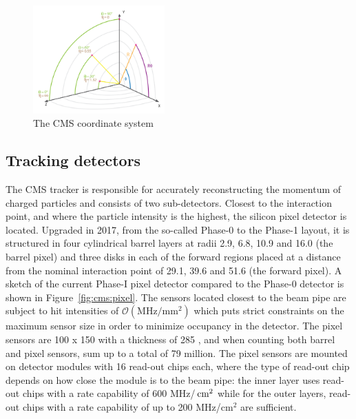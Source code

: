 \begin{figure}[h] 
    \centering
    \includegraphics[width=0.45\textwidth]{figures/cms/img_cms_coordinates.png}
    \caption{The CMS coordinate system~\cite{Lenzi:2013xpa}}
    \label{fig:cms:coordinates}
\end{figure}


\subsection{Tracking detectors}
The CMS tracker is responsible for accurately reconstructing the momentum of charged particles and consists of two sub-detectors. Closest to the interaction point, and where the particle intensity is the highest, the silicon pixel detector is located. Upgraded in 2017, from the so-called Phase-0 to the Phase-1 layout, it is structured in four cylindrical barrel layers at radii 2.9, 6.8, 10.9 and 16.0 \cm (the barrel pixel) and three disks in each of the forward regions placed at a distance from the nominal interaction point of 29.1, 39.6 and 51.6 \cm (the forward pixel). A sketch of the current Phase-I pixel detector compared to the Phase-0 detector is shown in Figure~\ref{fig:cms:pixel}. The sensors located closest to the beam pipe are subject to hit intensities of $\mathcal{O}( \textrm{MHz}/\textrm{mm}^2 )$ which puts strict constraints on the maximum sensor size in order to minimize occupancy in the detector. The pixel sensors are 100 \micron x 150 \micron with a thickness of 285 \micron, and when counting both barrel and pixel sensors, sum up to a total of 79 million. The pixel sensors are mounted on detector modules with 16 read-out chips each, where the type of read-out chip depends on how close the module is to the beam pipe: the inner layer uses read-out chips with a rate capability of 600 MHz/$\,\text{cm}^2$ while for the outer layers, read-out chips with a rate capability of up to 200 MHz/$\textrm{cm}^2$ are sufficient.

